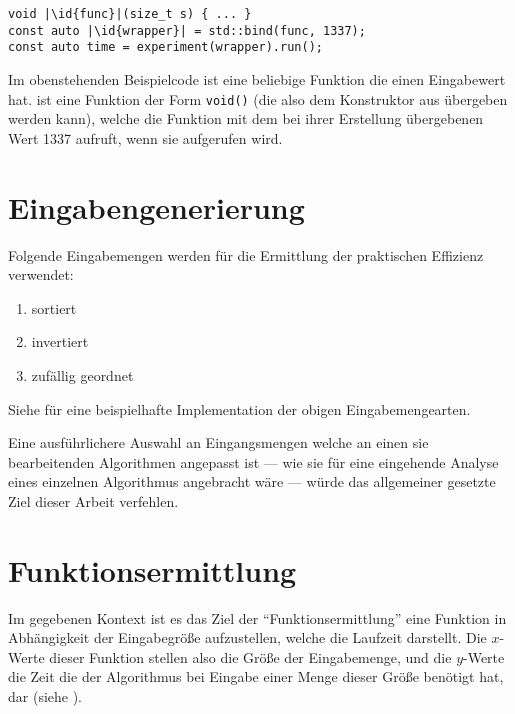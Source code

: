 \begin{lstlisting}[numbers=none]
void |\id{func}|(size_t s) { ... }
const auto |\id{wrapper}| = std::bind(func, 1337);
const auto time = experiment(wrapper).run();
\end{lstlisting}
Im obenstehenden Beispielcode ist  eine beliebige Funktion die einen Eingabewert hat.  ist eine Funktion der Form \lstinline{void()} (die also dem Konstruktor aus  übergeben werden kann), welche die Funktion  mit dem bei ihrer Erstellung übergebenen Wert 1337 aufruft, wenn sie aufgerufen wird.

\section{Eingabengenerierung}
\label{sec:eingabengen}


Folgende Eingabemengen werden für die Ermittlung der praktischen Effizienz verwendet:

\begin{enumerate}
    \item sortiert
    \item invertiert
    \item zufällig geordnet
\end{enumerate}

Siehe  für eine beispielhafte Implementation der obigen Eingabemengearten.

Eine ausführlichere Auswahl an Eingangsmengen welche an einen sie bearbeitenden Algorithmen angepasst ist --- wie sie für eine eingehende Analyse eines einzelnen Algorithmus angebracht wäre --- würde das allgemeiner gesetzte Ziel dieser Arbeit verfehlen.

\section{Funktionsermittlung}
\label{sec:funkterm}

Im gegebenen Kontext ist es das Ziel der \enquote{Funktionsermittlung} eine Funktion in Abhängigkeit der Eingabegröße aufzustellen, welche die Laufzeit darstellt. Die $x$-Werte dieser Funktion stellen also die Größe der Eingabemenge, und die $y$-Werte die Zeit die der Algorithmus bei Eingabe einer Menge dieser Größe benötigt hat, dar (siehe ).


